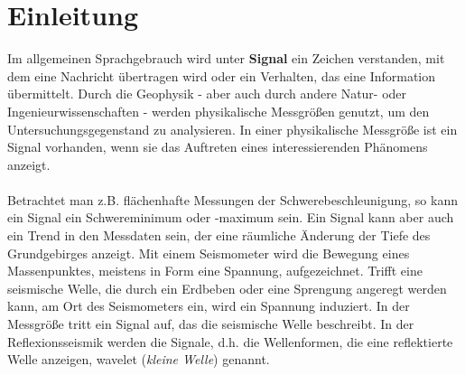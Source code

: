 
\chapter{Einleitung}



Im allgemeinen Sprachgebrauch wird unter {\bf Signal} ein Zeichen verstanden, mit dem eine Nachricht übertragen wird oder ein Verhalten, das eine Information übermittelt. Durch die Geophysik - aber auch durch andere Natur- oder Ingenieurwissenschaften - werden physikalische Messgrößen genutzt, um den Untersuchungsgegenstand zu analysieren. In einer physikalische Messgröße ist ein Signal vorhanden, wenn sie das Auftreten eines interessierenden Phänomens anzeigt.\\\\
Betrachtet man z.B. flächenhafte Messungen der Schwerebeschleunigung, so kann ein Signal ein Schwereminimum oder -maximum sein. Ein Signal kann aber auch ein Trend in den Messdaten sein, der eine räumliche Änderung der Tiefe des Grundgebirges anzeigt. Mit einem Seismometer wird die  Bewegung eines Massenpunktes, meistens in Form eine Spannung, aufgezeichnet. Trifft eine seismische Welle, die durch ein Erdbeben oder eine Sprengung angeregt werden kann, am Ort des Seismometers ein, wird ein Spannung induziert. In der Messgröße tritt ein Signal auf, das die seismische Welle beschreibt. In der Reflexionsseismik werden die Signale, d.h. die Wellenformen, die eine reflektierte Welle anzeigen, wavelet (\textsl{kleine Welle}) genannt.\\

